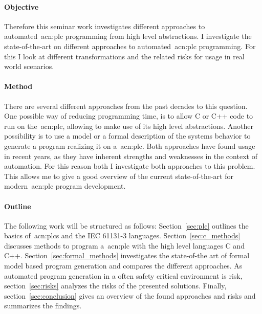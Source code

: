\paragraph{Objective}
Therefore this seminar work investigates different approaches to automated~\gls{acn:plc} programming from high level abstractions.
I investigate the state-of-the-art on different approaches to automated~\gls{acn:plc} programming.
For this I look at different transformations and the related risks for usage in real world scenarios.

\paragraph{Method}
There are several different approaches from the past decades to this question.
One possible way of reducing programming time, is to allow C or C++ code to run on the~\gls{acn:plc}, allowing to make use of its high level abstractions.
Another possibility is to use a model or a formal description of the systems behavior to generate a program realizing it on a~\gls{acn:plc}.
Both approaches have found usage in recent years, as they have inherent strengths and weaknesses in the context of automation.
For this reason both I investigate both approaches to this problem.
This allows me to give a good overview of the current state-of-the-art for modern~\gls{acn:plc} program development.

\paragraph{Outline}
The following work will be structured as follows: 
Section~\ref{sec:plc} outlines the basics of~\glspl{acn:plc} and the IEC 61131-3 languages. 
Section~\ref{sec:c_methods} discusses methods to program a~\gls{acn:plc} with the high level languages C and C++.
Section~\ref{sec:formal_methods} investigates the state-of-the art of formal model based program generation and compares the different approaches.
As automated program generation in a often safety critical environment is risk, section~\ref{sec:risks} analyzes the risks of the presented solutions.
Finally, section~\ref{sec:conclusion} gives an overview of the found approaches and risks and summarizes the findings.